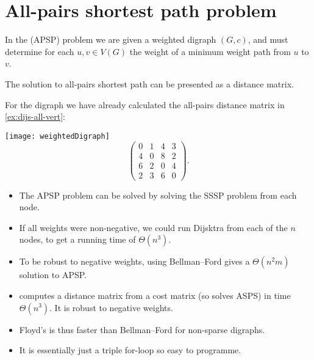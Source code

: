 


\chapter{All-pairs shortest path problem} %
\label{sec:APSP}

In the  (APSP) problem we are given a weighted digraph $(G, c)$, and must determine 
for each $u, v\in V(G)$ the weight of a minimum weight path from $u$
to $v$.

The solution to all-pairs shortest path can be presented as a distance matrix.

\begin{Boxample}[0]
\label{eg:APSP}
For the digraph we have already
calculated the all-pairs distance matrix in \cref{ex:dijs-all-vert}:

\texttt{[image: weightedDigraph]}
$$
\left(
\begin{matrix}
0 & 1 & 4 & 3 \\
4 & 0 & 8 & 2 \\
6 & 2 & 0 & 4 \\
2 & 3 & 6 & 0
\end{matrix}
\right).
$$
\end{Boxample}

\begin{itemize}
\item The APSP problem can be solved by solving the SSSP problem from each node.
\item If all weights were non-negative, we could run Dijsktra from each of the $n$ nodes, to get a running time of $\Theta(n^3)$.
\item To be robust to negative weights, using Bellman--Ford gives a $\Theta(n^2 m)$ solution to APSP.
\item {} computes a distance matrix
from a cost matrix (so solves ASPS) in time $\Theta(n^3)$. 
It is robust to negative weights. 
\item Floyd's is thus faster than Bellman--Ford for non-sparse digraphs.
\item It is essentially just a triple for-loop so easy to programme.
\end{itemize}

